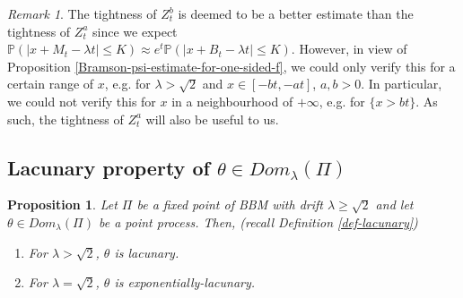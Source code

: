 \documentclass[a4paper,reqno]{amsart}%
\newcommand{\1}{\mathbf 1}
\theoremstyle{mine}
\numberwithin{theorem}{section}
\newtheorem{proposition}[theorem]{Proposition}
\numberwithin{equation}{section}
\theoremstyle{remark}
\newtheorem{remark}{Remark}
\begin{document}
\begin{remark}
    The tightness of $Z_t^b$ is deemed to be a better estimate than the tightness of $Z_t^a$ since we expect $\mathbb{P}(|x + M_t - \lambda t| \leq K) \approx e^t \mathbb{P}(|x + B_t - \lambda t| \leq K)$. However, in view of Proposition \ref{Bramson-psi-estimate-for-one-sided-f}, we could only verify this for a certain range of $x$, e.g. for $\lambda>\sqrt{2}$ and $x\in [-bt, -at]$, $a,b>0$. In particular, we could not verify this for $x$ in a neighbourhood of $+\infty$, e.g. for $\{x >bt\}$. As such, the tightness of $Z_t^a$ will also be useful to us.  
\end{remark}


\subsection{Lacunary property of $\theta \in Dom_{\lambda}(\Pi)$}



\begin{proposition}\label{lacunary-prop}
 Let $\Pi$ be a fixed point of BBM with drift $\lambda \geq \sqrt{2}$ and let $\theta \in Dom_{\lambda}(\Pi)$ be a point process. Then, (recall Definition \ref{def-lacunary})
 \begin{enumerate}
     \item For $\lambda > \sqrt{2}$, $\theta$ is lacunary.
     \item For $\lambda = \sqrt{2}$, $\theta$ is exponentially-lacunary. 
 \end{enumerate}
\end{proposition}
\end{document}
